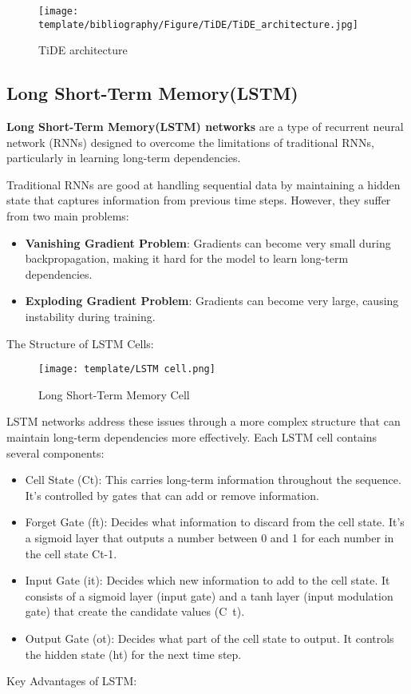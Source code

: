 \documentclass{ieeeojies}
\begin{document}
\begin{figure}[H]
  \centering
  \begin{minipage}{0.8\linewidth}
    \centering
    \texttt{[image: template/bibliography/Figure/TiDE/TiDE\_architecture.jpg]}
    \caption{TiDE architecture}
    \label{fig8}
  \end{minipage}
\end{figure}
\subsection{Long Short-Term Memory(LSTM)}
\textbf{Long Short-Term Memory(LSTM) networks} are a type of recurrent neural network (RNNs) designed to overcome the limitations of traditional RNNs, particularly in learning long-term dependencies.

Traditional RNNs are good at handling sequential data by maintaining a hidden state that captures information from previous time steps. However, they suffer from two main problems:
\begin{itemize}
 \item \textbf{Vanishing Gradient Problem}: Gradients can become very small during backpropagation, making it hard for the model to learn long-term dependencies.
 \item \textbf{Exploding Gradient Problem}: Gradients can become very large, causing instability during training.
\end{itemize}

The Structure of LSTM Cells:
\begin{figure}[H]
  \centering
  \begin{minipage}{0.8\linewidth}
    \centering
    \texttt{[image: template/LSTM cell.png]}
    \caption{Long Short-Term Memory Cell \cite{b1}}
    \label{fig8}
  \end{minipage}
\end{figure}


LSTM networks address these issues through a more complex structure that can maintain long-term dependencies more effectively. Each LSTM cell contains several components:
\begin{itemize}
\item Cell State (Ct): This carries long-term information throughout the sequence. It's controlled by gates that can add or remove information.
\item Forget Gate (ft): Decides what information to discard from the cell state. It's a sigmoid layer that outputs a number between 0 and 1 for each number in the cell state Ct-1.
\item Input Gate (it): Decides which new information to add to the cell state. It consists of a sigmoid layer (input gate) and a tanh layer (input modulation gate) that create the candidate values (C~t).
\item Output Gate (ot): Decides what part of the cell state to output. It controls the hidden state (ht) for the next time step.
\end{itemize}
Key Advantages of LSTM:
\end{document}
